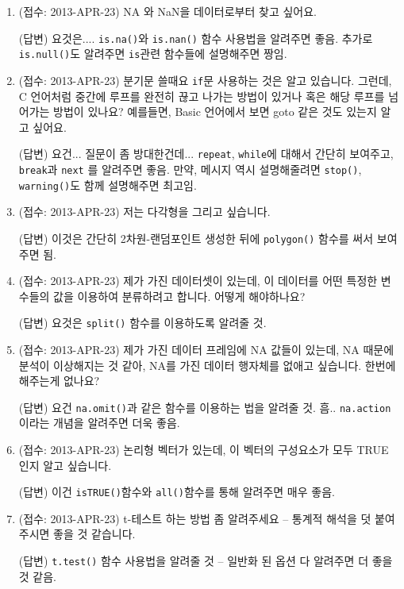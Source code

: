 \documentclass{article}
\begin{document}
\begin{enumerate}
	\item (접수: 2013-APR-23)  NA 와 NaN을 데이터로부터 찾고 싶어요.
	
	\textsf{(답변)} 요것은.... \texttt{is.na()}와 \texttt{is.nan()} 함수 사용법을 알려주면 좋음.  추가로 \texttt{is.null()}도 알려주면 \texttt{is}관련 함수들에 설명해주면 짱임.
	
	\item (접수: 2013-APR-23)  분기문 쓸때요 \texttt{if}문 사용하는 것은 알고 있습니다.  그런데, C 언어처럼 중간에 루프를 완전히 끊고 나가는 방법이 있거나 혹은 해당 루프를 넘어가는 방법이 있나요?  예를들면, Basic 언어에서 보면 goto 같은 것도 있는지 알고 싶어요.
	
	\textsf{(답변)} 요건... 질문이 좀 방대한건데... \texttt{repeat}, \texttt{while}에 대해서 간단히 보여주고, \texttt{break}과 \texttt{next} 를 알려주면 좋음. 
	만약, 메시지 역시 설명해줄려면  \texttt{stop()}, \texttt{warning()}도 함께 설명해주면 최고임.  

	\item (접수: 2013-APR-23)  저는 다각형을 그리고 싶습니다. 
	
	\textsf{(답변)}  이것은 간단히 2차원-랜덤포인트 생성한 뒤에 \texttt{polygon()} 함수를 써서 보여주면 됨. 

	\item (접수: 2013-APR-23)  제가 가진 데이터셋이 있는데, 이 데이터를 어떤 특정한 변수들의 값을 이용하여 분류하려고 합니다.  어떻게 해야하나요?
	
	\textsf{(답변)}  요것은 \texttt{split()} 함수를 이용하도록 알려줄 것. 

	\item (접수: 2013-APR-23) 제가 가진 데이터 프레임에 NA 값들이 있는데, NA 때문에 분석이 이상해지는 것 같아, NA를 가진 데이터 행자체를 없애고 싶습니다.  한번에 해주는게 없나요? 
	
	\textsf{(답변)}  요건 \texttt{na.omit()}과 같은 함수를 이용하는 법을 알려줄 것.  흠.. \texttt{na.action}이라는 개념을 알려주면 더욱 좋음. 

	\item (접수: 2013-APR-23) 논리형 벡터가 있는데, 이 벡터의 구성요소가 모두 TRUE 인지 알고 싶습니다. 
	
	\textsf{(답변)} 이건 \texttt{isTRUE()}함수와 \texttt{all()}함수를 통해 알려주면 매우 좋음.
	
	\item (접수: 2013-APR-23) t-테스트 하는 방법 좀 알려주세요 -- 통계적 해석을 덧 붙여주시면 좋을 것 같습니다.
	
	\textsf{(답변)} \texttt{t.test()} 함수 사용법을 알려줄 것 -- 일반화 된 옵션 다 알려주면 더 좋을 것 같음. 
	

\end{enumerate}
\end{document}
